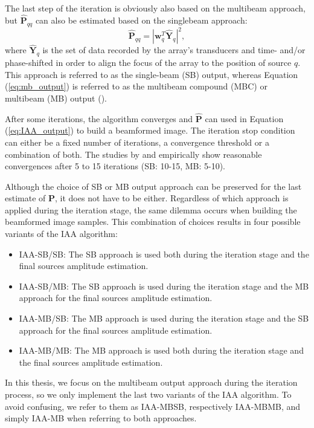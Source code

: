 The last step of the iteration is obviously also based on the multibeam approach, but $\boldsymbol{\hat{P}}_{qq}$ can also be estimated based on the singlebeam approach:
\begin{equation}
    \boldsymbol{\hat{P}}_{qq} = |\boldsymbol{w}_q^T \boldsymbol{\hat{Y}}_q |^2,
\label{eq:sb_output}
\end{equation}
\noindent
where $\boldsymbol{\hat{Y}}_q$ is the set of data recorded by the array's transducers and time- and/or phase-shifted in order to align the focus of the array to the position of source $q$. This approach is referred to as the single-beam (SB) output, whereas Equation (\ref{eq:mb_output}) is referred to as the multibeam compound (MBC) or multibeam (MB) output (\cite{Jensen_multibeam, Jensen_IAA}).

After some iterations, the algorithm converges and $\boldsymbol{\hat{P}}$ can used in Equation (\ref{eq:IAA_output}) to build a beamformed image.
The iteration stop condition can either be a fixed number of iterations, a convergence threshold or a combination of both.
The studies by \cite{Yardibi_nonparametric_IAA} and \cite{Jensen_IAA} empirically show reasonable convergences after 5 to 15 iterations (SB: 10-15, MB: 5-10).

Although the choice of SB or MB output approach can be preserved for the last estimate of $\boldsymbol{P}$, it does not have to be either. Regardless of which approach is applied during the iteration stage, the same dilemma occurs when building the beamformed image samples. This combination of choices results in four possible variants of the IAA algorithm:
\begin{itemize}
    \item IAA-SB/SB: The SB approach is used both during the iteration stage and the final sources amplitude estimation.
    \item IAA-SB/MB: The SB approach is used during the iteration stage and the MB approach for the final sources amplitude estimation.
    \item IAA-MB/SB: The MB approach is used during the iteration stage and the SB approach for the final sources amplitude estimation.
    \item IAA-MB/MB: The MB approach is used both during the iteration stage and the final sources amplitude estimation.
\end{itemize}
\noindent
In this thesis, we focus on the multibeam output approach during the iteration process, so we only implement the last two variants of the IAA algorithm.
To avoid confusing, we refer to them as IAA-MBSB, respectively IAA-MBMB, and simply IAA-MB when referring to both approaches.
